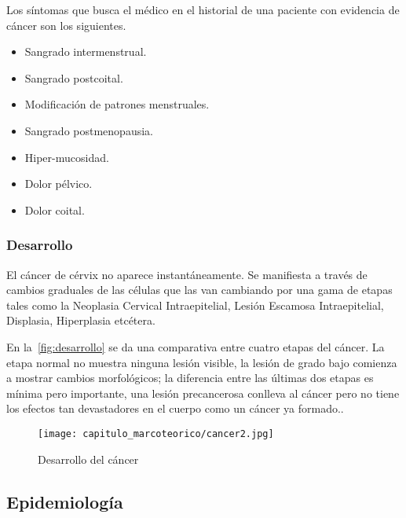 Los síntomas que busca el médico en el historial de una paciente con evidencia de cáncer
son los siguientes. 

\begin{itemize}
    \item Sangrado intermenstrual.
    \item Sangrado postcoital.
    \item Modificación de patrones menstruales.
    \item Sangrado postmenopausia.
    \item Hiper-mucosidad.
    \item Dolor pélvico.
    \item Dolor coital.
\end{itemize}

\subsubsection{Desarrollo}

El cáncer de cérvix no aparece instantáneamente. Se manifiesta a través de
cambios graduales de las células que las van cambiando por una gama de etapas
tales como la Neoplasia Cervical Intraepitelial, Lesión Escamosa Intraepitelial,
Displasia, Hiperplasia etcétera.~\cite{NacionalCancerInstitute2012}

En la~\autoref{fig:desarrollo} se da una comparativa entre cuatro etapas del
cáncer. La etapa normal no muestra ninguna lesión visible, la lesión de grado
bajo comienza a mostrar cambios morfológicos; la diferencia entre las últimas
dos etapas es mínima pero importante, una lesión precancerosa conlleva al cáncer
pero no tiene los efectos tan devastadores en el cuerpo como un cáncer ya
formado..

\begin{figure}[H]
    \centering
    \texttt{[image: capitulo\_marcoteorico/cancer2.jpg]}
    \caption{Desarrollo del cáncer}\label{fig:desarrollo}
\end{figure}

\subsection{Epidemiología}

